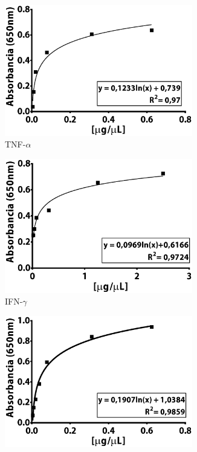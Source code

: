 \documentclass[12pt,letterpaper,oneside]{scrbook}
\begin{document}
\begin{figure}[h!]
    \begin{subfigure}{0.5\textwidth}
        \includegraphics[width=0.9\textwidth]{peptidos/tnfa}
        \caption{TNF-$\alpha$}
        \label{fig:pep:tnfa}
        \end{subfigure}
    \begin{subfigure}{0.5\textwidth}
        \includegraphics[width=0.9\textwidth]{peptidos/ifng}
        \caption{IFN-$\gamma$}
        \label{fig:pep:ifng}
    \end{subfigure}
      \begin{subfigure}{0.5\textwidth}
        \includegraphics[width=0.9\textwidth]{peptidos/il1b}

\end{subfigure}
\end{figure}
\end{document}
